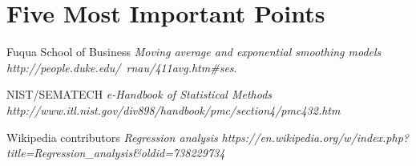 \documentclass[12pt,conference,onecolumn]{IEEEtran}
\begin{document}
\section{Five Most Important Points}
\label{sec:FMIP}
\ifCLASSOPTIONcaptionsoff
  \newpage
\fi



\begin{thebibliography}{1}
 Fuqua School of Business {\em Moving average and exponential smoothing models} {\em http://people.duke.edu/~rnau/411avg.htm\#ses}.

 NIST/SEMATECH {\em e-Handbook of Statistical Methods} {\em http://www.itl.nist.gov/div898/handbook/pmc/section4/pmc432.htm}

 Wikipedia contributors {\em Regression analysis} {\em https://en.wikipedia.org/w/index.php?title=Regression\_analysis\&oldid=738229734}
\end{thebibliography}
\end{document}
